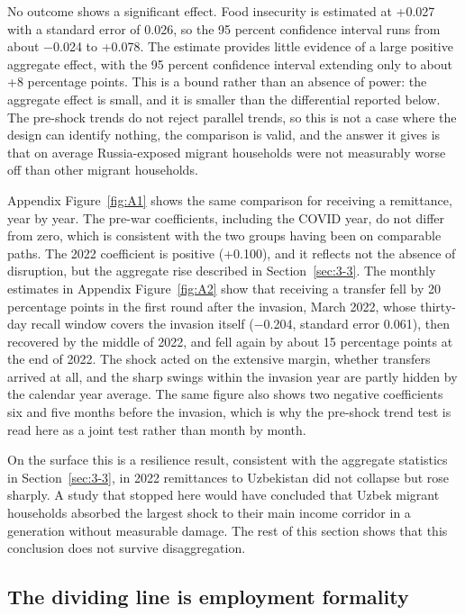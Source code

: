 No outcome shows a significant effect. Food insecurity is estimated at +0.027 with a standard error of 0.026, so the 95 percent confidence interval runs from about $-$0.024 to +0.078. The estimate provides little evidence of a large positive aggregate effect, with the 95 percent confidence interval extending only to about +8 percentage points. This is a bound rather than an absence of power: the aggregate effect is small, and it is smaller than the differential reported below. The pre-shock trends do not reject parallel trends, so this is not a case where the design can identify nothing, the comparison is valid, and the answer it gives is that on average Russia-exposed migrant households were not measurably worse off than other migrant households.

Appendix Figure~\ref{fig:A1} shows the same comparison for receiving a remittance, year by year. The pre-war coefficients, including the COVID year, do not differ from zero, which is consistent with the two groups having been on comparable paths. The 2022 coefficient is positive (+0.100), and it reflects not the absence of disruption, but the aggregate rise described in Section~\ref{sec:3-3}. The monthly estimates in Appendix Figure~\ref{fig:A2} show that receiving a transfer fell by 20 percentage points in the first round after the invasion, March 2022, whose thirty-day recall window covers the invasion itself ($-$0.204, standard error 0.061), then recovered by the middle of 2022, and fell again by about 15 percentage points at the end of 2022. The shock acted on the extensive margin, whether transfers arrived at all, and the sharp swings within the invasion year are partly hidden by the calendar year average. The same figure also shows two negative coefficients six and five months before the invasion, which is why the pre-shock trend test is read here as a joint test rather than month by month.

On the surface this is a resilience result, consistent with the aggregate statistics in Section~\ref{sec:3-3}, in 2022 remittances to Uzbekistan did not collapse but rose sharply. A study that stopped here would have concluded that Uzbek migrant households absorbed the largest shock to their main income corridor in a generation without measurable damage. The rest of this section shows that this conclusion does not survive disaggregation.

\subsection{The dividing line is employment formality}\label{sec:7-2}

